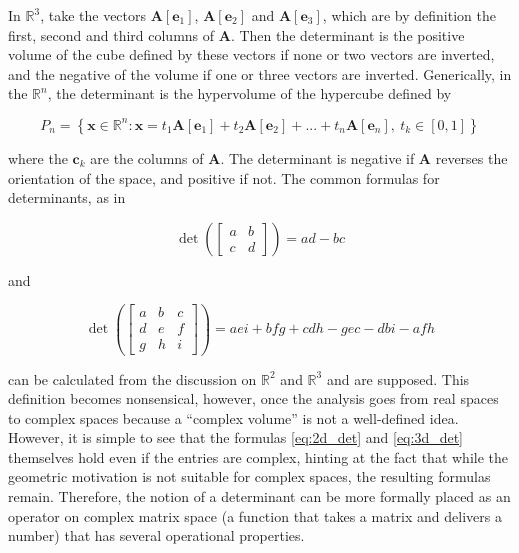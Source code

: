 	In $\mathbb{R}^3$, take the vectors $\mathbf{A}\left[\mathbf{e}_1\right]$, $\mathbf{A}\left[\mathbf{e}_2\right]$ and $\mathbf{A}\left[\mathbf{e}_3\right]$, which are by definition the first, second and third columns of $\mathbf{A}$. Then the determinant is the positive volume of the cube defined by these vectors if none or two vectors are inverted, and the negative of the volume if one or three vectors are inverted. Generically, in the $\mathbb{R}^n$, the determinant is the hypervolume of the hypercube defined by

\begin{equation} P_n = \left\{\mathbf{x}\in\mathbb{R}^n: \mathbf{x} = t_1\mathbf{A}\left[\mathbf{e}_1\right] + t_2\mathbf{A}\left[\mathbf{e}_2\right] + ... + t_n\mathbf{A}\left[\mathbf{e}_n\right],\ t_k\in\left[0,1\right]\right\} \end{equation}

	\noindent where the $\mathbf{c}_k$ are the columns of $\mathbf{A}$. The determinant is negative if $\mathbf{A}$ reverses the orientation of the space, and positive if not. The common formulas for determinants, as in

\begin{equation} \det\left(\left[\begin{array}{cc} a & b \\[3mm] c & d\end{array}\right]\right) = ad - bc \label{eq:2d_det}\end{equation}

	\noindent and

\begin{equation} \det\left(\left[\begin{array}{ccc} a & b & c \\[3mm] d & e & f \\[3mm] g & h & i\end{array}\right]\right) = aei + bfg + cdh - gec - dbi - afh \label{eq:3d_det}\end{equation}

	\noindent can be calculated from the discussion on $\mathbb{R}^2$ and $\mathbb{R}^3$ and are supposed. This definition becomes nonsensical, however, once the analysis goes from real spaces to complex spaces because a ``complex volume'' is not a well-defined idea. However, it is simple to see that the formulas \eqref{eq:2d_det} and \eqref{eq:3d_det} themselves hold even if the entries are complex, hinting at the fact that while the geometric motivation is not suitable for complex spaces, the resulting formulas remain. Therefore, the notion of a determinant can be more formally placed as an operator on complex matrix space (a function that takes a matrix and delivers a number) that has several operational properties.

